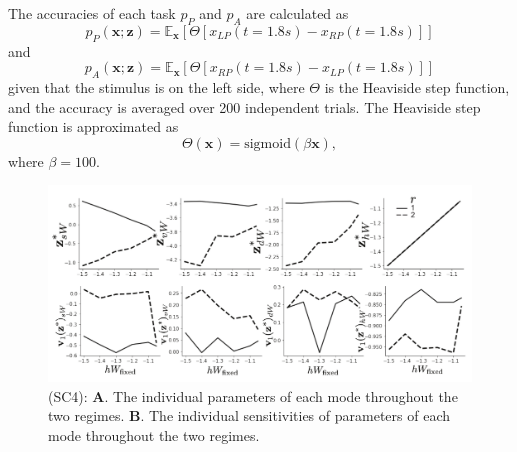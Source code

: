 \documentclass[11pt]{article}
\begin{document}
The accuracies of each task $p_P$ and $p_A$ are calculated as
\begin{equation}
p_P(\mathbf{x}; \mathbf{z}) = \mathbb{E}_{\mathbf{x}}\left[\Theta[x_{LP}(t=1.8s) - x_{RP}(t=1.8s)]\right]
\end{equation}
and 
\begin{equation}
p_A(\mathbf{x}; \mathbf{z}) = \mathbb{E}_{\mathbf{x}}\left[\Theta[x_{RP}(t=1.8s) - x_{LP}(t=1.8s)]\right]
\end{equation}
given that the stimulus is on the left side, where $\Theta$ is the Heaviside step function, and the accuracy is averaged over 200 independent trials.  The Heaviside step function is approximated as
\begin{equation}
\Theta(\mathbf{x}) = \text{sigmoid}(\beta \mathbf{x}),
\end{equation}
where $\beta = 100$.

\begin{figure}
\begin{center}
\includegraphics[scale=0.8]{figures/figSC4/figSC4.pdf}
\end{center}
\caption{\small (SC4):  \textbf{A}. The individual parameters of each mode throughout the two regimes.
\textbf{B}. The individual sensitivities of parameters of each mode throughout the two regimes.
}
\label{fig:SC4}
\end{figure}
\end{document}
